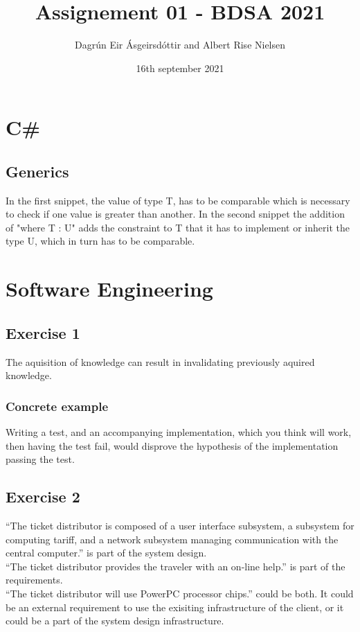 \documentclass[11pt,oneside]{book}
\title{Assignement 01 - BDSA 2021}
\author{Dagrún Eir Ásgeirsdóttir and Albert Rise Nielsen}
\date{16th september 2021}
\begin{document}
   \maketitle
   \frontmatter
   \tableofcontents

   \mainmatter
   \chapter{C\#}
   \section{Generics}
   In the first snippet, the value of type T, has to be comparable which is necessary to check if one value is greater than another.
   In the second snippet the addition of "where T : U" adds the constraint to T that it has to implement or inherit the type U, which in turn has to be comparable.

   \chapter{Software Engineering}
   \section{Exercise 1}
   The aquisition of knowledge can result in invalidating previously aquired knowledge.\\
   \subsection{Concrete example}
   Writing a test, and an accompanying implementation, which you think will work, then having the test fail, would disprove the hypothesis of the implementation passing the test.   

   \section{Exercise 2}
   “The ticket distributor is composed of a user interface subsystem, a subsystem for computing tariff, and a network subsystem managing communication with the central computer.” is part of the system design.\\
   “The ticket distributor provides the traveler with an on-line help.” is part of the requirements.\\

   “The ticket distributor will use PowerPC processor chips.” could be both. It could be an external requirement to use the exisiting infrastructure of the client, or it could be a part of the system design infrastructure.
\end{document}
